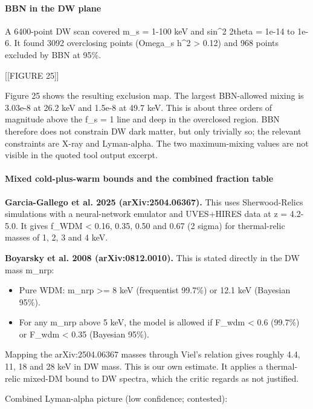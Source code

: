 \documentclass[11pt,a4paper]{article}
\begin{document}
\paragraph{BBN in the DW plane}
A 6400-point DW scan covered m\_s = 1-100 keV and sin\textasciicircum{}2 2theta = 1e-14 to 1e-6. It found 3092 overclosing points (Omega\_s h\textasciicircum{}2 \textgreater{} 0.12) and 968 points excluded by BBN at 95\%.

[[FIGURE 25]]

Figure 25 shows the resulting exclusion map. The largest BBN-allowed mixing is 3.03e-8 at 26.2 keV and 1.5e-8 at 49.7 keV. This is about three orders of magnitude above the f\_s = 1 line and deep in the overclosed region. BBN therefore does not constrain DW dark matter, but only trivially so; the relevant constraints are X-ray and Lyman-alpha. The two maximum-mixing values are not visible in the quoted tool output excerpt.

\paragraph{Mixed cold-plus-warm bounds and the combined fraction table}
\textbf{Garcia-Gallego et al. 2025 (arXiv:2504.06367).} This uses Sherwood-Relics simulations with a neural-network emulator and UVES+HIRES data at z = 4.2-5.0. It gives f\_WDM \textless{} 0.16, 0.35, 0.50 and 0.67 (2 sigma) for thermal-relic masses of 1, 2, 3 and 4 keV.

\textbf{Boyarsky et al. 2008 (arXiv:0812.0010).} This is stated directly in the DW mass m\_nrp:

\begin{itemize}
  \item Pure WDM: m\_nrp \textgreater{}= 8 keV (frequentist 99.7\%) or 12.1 keV (Bayesian 95\%).
  \item For any m\_nrp above 5 keV, the model is allowed if F\_wdm \textless{} 0.6 (99.7\%) or F\_wdm \textless{} 0.35 (Bayesian 95\%).
\end{itemize}
Mapping the arXiv:2504.06367 masses through Viel's relation gives roughly 4.4, 11, 18 and 28 keV in DW mass. This is our own estimate. It applies a thermal-relic mixed-DM bound to DW spectra, which the critic regards as not justified.

Combined Lyman-alpha picture (low confidence; contested):
\end{document}

